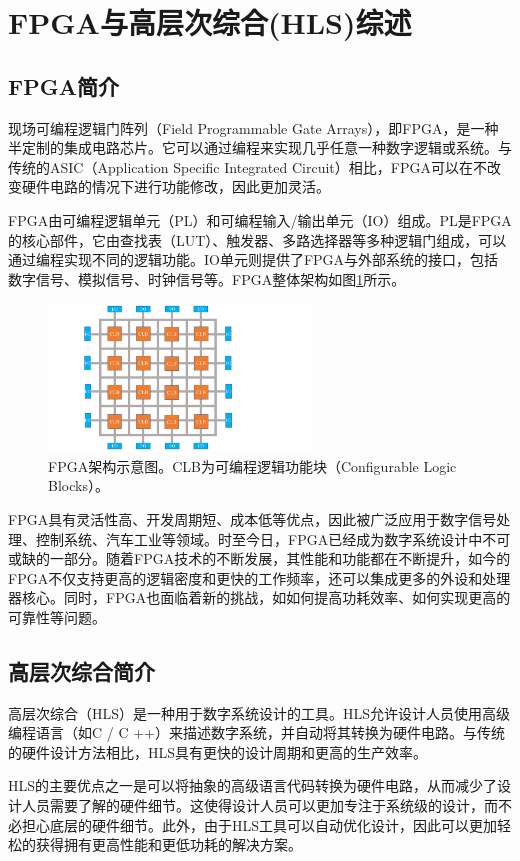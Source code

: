 \section{FPGA与高层次综合(HLS)综述}
\subsection{FPGA简介}
现场可编程逻辑门阵列（Field Programmable Gate Arrays），即FPGA，是一种半定制的集成电路芯片。它可以通过编程来实现几乎任意一种数字逻辑或系统\cite{kuon2008fpga}。与传统的ASIC（Application Specific Integrated Circuit）相比，FPGA可以在不改变硬件电路的情况下进行功能修改，因此更加灵活。 

FPGA由可编程逻辑单元（PL）和可编程输入/输出单元（IO）组成。PL是FPGA的核心部件，它由查找表（LUT）、触发器、多路选择器等多种逻辑门组成，可以通过编程实现不同的逻辑功能。IO单元则提供了FPGA与外部系统的接口，包括数字信号、模拟信号、时钟信号等。FPGA整体架构如图\ref{fig:FPGA}所示。
\begin{figure}
    \centering
    \includegraphics[width=7cm]{figures/FPGA.pdf}
    \caption{FPGA架构示意图。CLB为可编程逻辑功能块（Configurable Logic Blocks）。}
    \label{fig:FPGA}
\end{figure}

FPGA具有灵活性高、开发周期短、成本低等优点，因此被广泛应用于数字信号处理、控制系统、汽车工业等领域。时至今日，FPGA已经成为数字系统设计中不可或缺的一部分。随着FPGA技术的不断发展，其性能和功能都在不断提升，如今的FPGA不仅支持更高的逻辑密度和更快的工作频率，还可以集成更多的外设和处理器核心。同时，FPGA也面临着新的挑战，如如何提高功耗效率、如何实现更高的可靠性等问题。

\subsection{高层次综合简介}

高层次综合（HLS）是一种用于数字系统设计的工具。HLS允许设计人员使用高级编程语言（如C / C ++）来描述数字系统，并自动将其转换为硬件电路。与传统的硬件设计方法相比，HLS具有更快的设计周期和更高的生产效率。

HLS的主要优点之一是可以将抽象的高级语言代码转换为硬件电路，从而减少了设计人员需要了解的硬件细节。这使得设计人员可以更加专注于系统级的设计，而不必担心底层的硬件细节。此外，由于HLS工具可以自动优化设计，因此可以更加轻松的获得拥有更高性能和更低功耗的解决方案。

